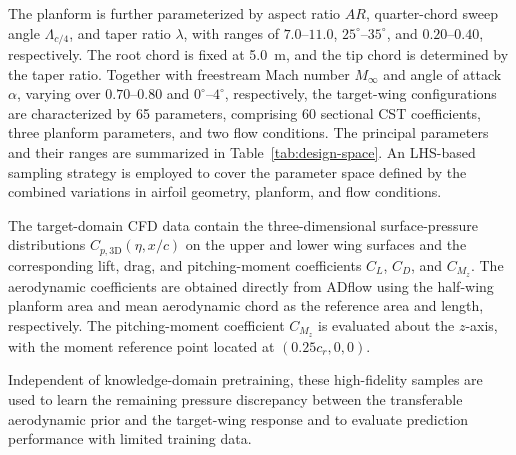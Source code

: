 The planform is further parameterized by aspect ratio $AR$, quarter-chord sweep angle $\Lambda_{c/4}$, and taper ratio $\lambda$, with ranges of $7.0$--$11.0$, $25^\circ$--$35^\circ$, and $0.20$--$0.40$, respectively. The root chord is fixed at \SI{5.0}{m}, and the tip chord is determined by the taper ratio. Together with freestream Mach number $M_\infty$ and angle of attack $\alpha$, varying over $0.70$--$0.80$ and $0^\circ$--$4^\circ$, respectively, the target-wing configurations are characterized by 65 parameters, comprising 60 sectional CST coefficients, three planform parameters, and two flow conditions. The principal parameters and their ranges are summarized in Table~\ref{tab:design-space}. An LHS-based sampling strategy is employed to cover the parameter space defined by the combined variations in airfoil geometry, planform, and flow conditions.



The target-domain CFD data contain the three-dimensional surface-pressure distributions $C_{p,\mathrm{3D}}(\eta,x/c)$ on the upper and lower wing surfaces and the corresponding lift, drag, and pitching-moment coefficients $C_L$, $C_D$, and $C_{M_z}$. The aerodynamic coefficients are obtained directly from ADflow using the half-wing planform area and mean aerodynamic chord as the reference area and length, respectively. The pitching-moment coefficient $C_{M_z}$ is evaluated about the $z$-axis, with the moment reference point located at $(0.25c_r,0,0)$.

Independent of knowledge-domain pretraining, these high-fidelity samples are used to learn the remaining pressure discrepancy between the transferable aerodynamic prior and the target-wing response and to evaluate prediction performance with limited training data. 
